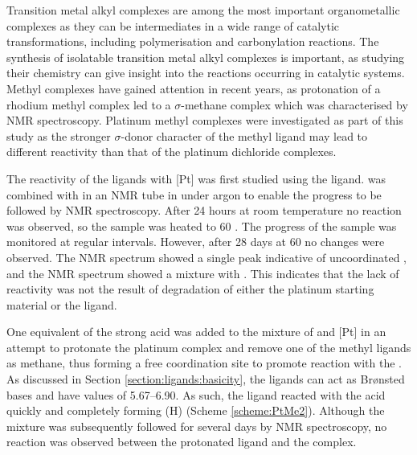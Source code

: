 Transition metal alkyl complexes are among the most important organometallic complexes as they can be intermediates in a wide range of catalytic transformations, including polymerisation and carbonylation reactions.\cite{Doherty1999, Veen2002}  The synthesis of isolatable transition metal alkyl complexes is important, as studying their chemistry can give insight into the reactions occurring in catalytic systems.\cite{Moss1996}  Methyl complexes have gained attention in recent years, as protonation of a rho\-dium methyl complex led to a $\sigma$-methane complex which was characterised by NMR spectroscopy.\cite{Bernskoetter2009}  Platinum methyl complexes were investigated as part of this study as the stronger $\sigma$-donor character of the methyl ligand may lead to different reactivity than that of the platinum dichloride complexes.\cite{Appleton1978}

The reactivity of the \tBuxantphos{} ligands with [Pt] was first studied using the \tButhixantphos{} ligand.  \tBuThixantphos{} was combined with \ce{[Pt(C6H10)Me2]} in an NMR tube in  under argon to enable the progress to be followed by NMR spectroscopy.  After 24 hours at room temperature no reaction was observed, so the sample was heated to 60 \degC.  The progress of the sample was monitored at regular intervals.  However, after 28 days at 60 \degC{} no changes were observed.  The \phosphorus{} NMR spectrum showed a single peak indicative of uncoordinated \tButhixantphos{}, and the \proton{} NMR spectrum showed a mixture with \ce{[Pt(C6H10)Me2]}.  This indicates that the lack of reactivity was not the result of degradation of either the platinum starting material or the \tButhixantphos{} ligand.  

One equivalent of the strong acid  was added to the mixture of \tButhixantphos{} and [Pt] in an attempt to protonate the platinum complex and remove one of the methyl ligands as methane, thus forming a free coordination site to promote reaction with the \tButhixantphos.  As discussed in Section \ref{section:ligands:basicity}, the \tBuxantphos{} ligands can act as Br\o{}nsted bases and have \pKb{} values of 5.67--6.90.  As such, the \tButhixantphos{} ligand reacted with the acid quickly and completely forming (\tButhixantphos H) (Scheme \ref{scheme:PtMe2}).  Although the mixture was subsequently followed for several days by NMR spectroscopy, no reaction was observed between the protonated \tButhixantphos{} ligand and the \ce{[Pt(C6H10)Me2]} complex.  

